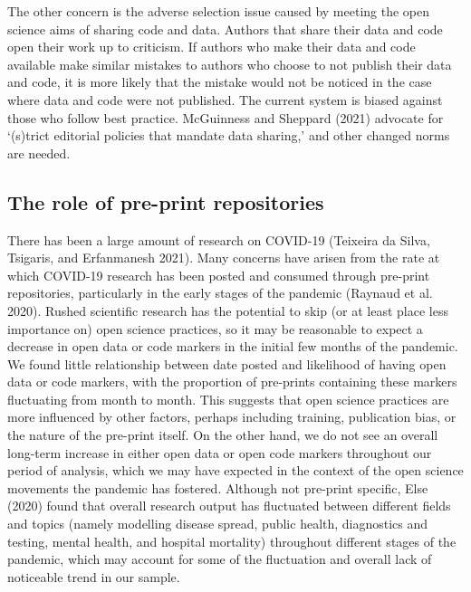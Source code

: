 \documentclass[
]{article}
\begin{document}
The other concern is the adverse selection issue caused by meeting the open science aims of sharing code and data. Authors that share their data and code open their work up to criticism. If authors who make their data and code available make similar mistakes to authors who choose to not publish their data and code, it is more likely that the mistake would not be noticed in the case where data and code were not published. The current system is biased against those who follow best practice. McGuinness and Sheppard (2021) advocate for `(s)trict editorial policies that mandate data sharing,' and other changed norms are needed.

\hypertarget{the-role-of-pre-print-repositories}{%
\subsection{The role of pre-print repositories}\label{the-role-of-pre-print-repositories}}

There has been a large amount of research on COVID-19 (Teixeira da Silva, Tsigaris, and Erfanmanesh 2021). Many concerns have arisen from the rate at which COVID-19 research has been posted and consumed through pre-print repositories, particularly in the early stages of the pandemic (Raynaud et al. 2020). Rushed scientific research has the potential to skip (or at least place less importance on) open science practices, so it may be reasonable to expect a decrease in open data or code markers in the initial few months of the pandemic. We found little relationship between date posted and likelihood of having open data or code markers, with the proportion of pre-prints containing these markers fluctuating from month to month. This suggests that open science practices are more influenced by other factors, perhaps including training, publication bias, or the nature of the pre-print itself. On the other hand, we do not see an overall long-term increase in either open data or open code markers throughout our period of analysis, which we may have expected in the context of the open science movements the pandemic has fostered. Although not pre-print specific, Else (2020) found that overall research output has fluctuated between different fields and topics (namely modelling disease spread, public health, diagnostics and testing, mental health, and hospital mortality) throughout different stages of the pandemic, which may account for some of the fluctuation and overall lack of noticeable trend in our sample.
\end{document}
